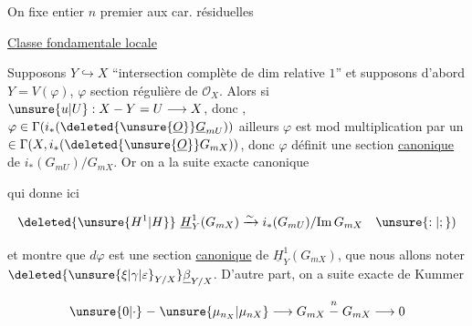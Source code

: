 On fixe entier $n$ premier aux car. résiduelles

\uline{Classe fondamentale locale}

Supposons $Y\hookrightarrow X$ ``intersection complète de dim relative $1$'' et supposons d'abord $Y=V(\varphi)$, $\varphi$ section régulière de $\mathcal O_X$. Alors si $\unsure{u|U}:X-Y=U\longrightarrow X$, donc ,  $\varphi\in\Gamma(i_*(\deleted{\unsure{\underline O}}\underline G_{mU}))$   ailleurs $\varphi$ est   mod multiplication par un $\in\Gamma(X,i_*(\deleted{\unsure{\underline O}}G_{mX}))$, donc  $\varphi$ définit une section \deleted{$\varphi\in$} \uline{canonique} de  $i_*(G_{mU})/G_{mX}$. Or on a la suite exacte canonique


qui donne ici

\[
\deleted{\unsure{H^1|H}}\ \underline H^1_Y(G_{mX})\xrightarrow{\sim}i_*(G_{mU})/\mathrm{Im}\,G_{mX}\quad \unsure{:|;})
\]

et montre que $d\varphi$ est une section \uline{canonique} de $\underline H^1_Y(G_{mX})$, que nous allons noter $\deleted{\unsure{\xi|\gamma|\varepsilon}_{Y/X}}\underline\beta_{Y/X}$. D'autre part, on a  suite exacte de Kummer

\[
\unsure{0|\cdot}\mathrel{-}\unsure{\mu_{n_X}|\mu_{nX}}\longrightarrow G_{mX}\overset{n}{\mathrel{-}} G_{mX}\longrightarrow 0
\]

